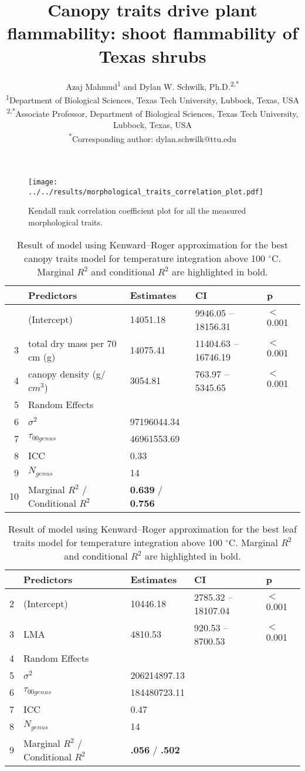 \documentclass[12pt]{report}
\title{Canopy traits drive plant flammability: shoot flammability of Texas shrubs}
\author{Azaj Mahmud\textsuperscript{1} and Dylan W. Schwilk, Ph.D.\textsuperscript{2,*}\\
\textsuperscript{1}Department of Biological Sciences, Texas Tech University, Lubbock, Texas, USA\\
\textsuperscript{2,*}Associate Professor, Department of Biological Sciences, Texas Tech University, Lubbock, Texas, USA\\
\vspace{1em}
\textsuperscript{*}Corresponding author: dylan.schwilk@ttu.edu}
\date{}
\begin{document}
\maketitle


\begin{figure}
\centering
\caption{Kendall rank correlation coefficient plot for all the measured morphological traits.}
\texttt{[image: ../../results/morphological\_traits\_correlation\_plot.pdf]}
\end{figure}

\clearpage

\begin{table}[ht]
\centering
\caption{Result of model using Kenward--Roger approximation for the best canopy traits model for temperature integration above 100 $^{\circ}$C. Marginal $R^2$ and conditional $R^2$ are highlighted in bold.}
\begin{tabular}{rllll}
 \hline
 & Predictors & Estimates & CI & p
 \\ 
  \hline
 & (Intercept) & 14051.18 & 9946.05 – 18156.31 & $<$0.001 \\ 
  3 & total dry mass per 70\,cm (g) & 14075.41 & 11404.63 – 16746.19 & $<$0.001 \\ 
  4 & canopy density (g/{$cm^3$}) & 3054.81 & 763.97 – 5345.65 & $<$0.001 \\ 
  5 & Random Effects &  &  &  \\ 
  6 & $\sigma^2$ & 97196044.34 &  &  \\ 
  7 & $\tau_{00 genus}$ & 46961553.69 &  &  \\ 
  8 & ICC & 0.33 &  &  \\ 
  9 & $N_{genus}$ & 14 &  &  \\ 
  10 & Marginal $R^2$ / Conditional $R^2$ & \textbf{0.639} / \textbf{0.756} &  &  \\ 
   \hline
\end{tabular}
\end{table}

\begin{table}[ht]
\centering
\caption{Result of model using Kenward--Roger approximation for the best leaf traits model for temperature integration above 100 $^{\circ}$C. Marginal $R^2$ and conditional $R^2$ are highlighted in bold.}
\begin{tabular}{rllll}
  \hline
 & Predictors & Estimates & CI & p \\ 
  \hline
2 & (Intercept) & 10446.18 & 2785.32 – 18107.04 & $<$0.001 \\ 
  3 & LMA & 4810.53 & 920.53 – 8700.53 & $<$0.001 \\ 
  4 & Random Effects &  &  &  \\ 
  5 & $\sigma^2$ & 206214897.13 &  &  \\ 
  6 & $\tau_{00 genus}$ & 184480723.11 &  &  \\ 
  7 & ICC & 0.47 &  &  \\ 
  8 & $N_{genus}$ & 14 &  &  \\ 
  9 & Marginal $R^2$ / Conditional $R^2$ & \textbf{.056} / \textbf{.502} &  &  \\ 
   \hline
\end{tabular}
\end{table}
\end{document}
